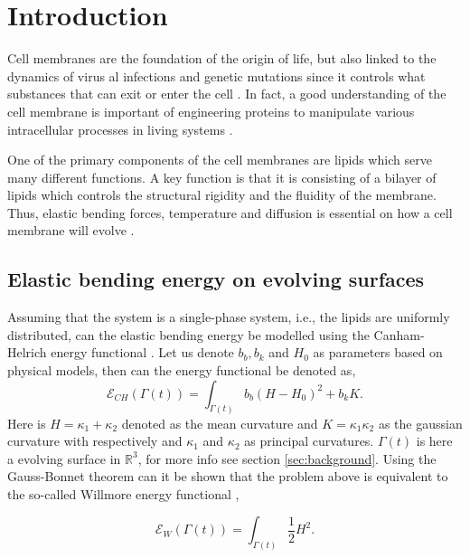 \section{Introduction}\label{sec:introduction}

Cell membranes are the foundation of the origin of life, but also linked to the dynamics of virus al infections and genetic mutations since it controls what substances that can exit or enter the cell \cite{ hurley2010membrane}. In fact, a good
understanding of the cell membrane is important of engineering proteins to manipulate various intracellular processes in living systems \cite{rojas1998genetic}.

One of the primary components of the cell membranes are lipids which serve many different functions. A key function is that it is consisting of a bilayer of lipids which controls the structural rigidity and the fluidity of the membrane. Thus, elastic
bending forces, temperature and diffusion is essential on how a cell membrane will evolve \cite{udo97,neidleman87}.


\subsection{Elastic bending energy on evolving surfaces}%
\label{sub:willmore_flow}

Assuming that the system is a single-phase system, i.e., the lipids are uniformly distributed, can the elastic bending energy be modelled using the Canham-Helrich energy functional \cite{helfrich1973elastic, wang08, udo97}. Let us denote $b_{b},
b_{k}$ and $H_{0}$ as parameters based on physical models, then can the energy functional be denoted as,
\begin{equation}
\label{eq:CH}
\mathcal{E} _{CH}\left( \Gamma\left( t \right)   \right) =   \int_{\Gamma\left( t \right)  }^{}  b_{b} \left( H- H_{0} \right) ^{2} + b_{k} K
.\end{equation}
Here is $H =  \kappa_1 + \kappa_2 $ denoted as the mean curvature and $K = \kappa_1 \kappa_2$ as the gaussian curvature with respectively and $\kappa_1$ and $\kappa_2$ as principal curvatures. $\Gamma \left( t
\right) $ is here a evolving surface in $\mathbb{R} ^3$, for more info see section \ref{sec:background}.  Using the Gauss-Bonnet theorem can it be shown that the problem above is equivalent to the so-called Willmore energy
functional \cite{montiel2009curves, willmore1996riemannian},

\begin{equation}
\label{eq:WE}
\mathcal{E} _{W} \left( \Gamma\left( t \right)   \right) = \int_{\Gamma\left( t \right)  }^{} \frac{1}{2} H ^2
.\end{equation}

